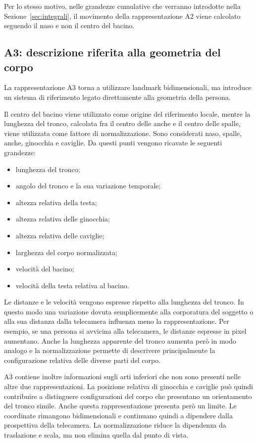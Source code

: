 Per lo stesso motivo, nelle grandezze cumulative che verranno introdotte nella Sezione~\ref{sec:integrali}, il movimento della rappresentazione A2 viene calcolato seguendo il naso e non il centro del bacino.

\subsection{A3: descrizione riferita alla geometria del corpo}

La rappresentazione A3 torna a utilizzare landmark bidimensionali, ma introduce un sistema di riferimento legato direttamente alla geometria della persona.

Il centro del bacino viene utilizzato come origine del riferimento locale, mentre la lunghezza del tronco, calcolata fra il centro delle anche e il centro delle spalle, viene utilizzata come fattore di normalizzazione.
Sono considerati naso, spalle, anche, ginocchia e caviglie. Da questi punti vengono ricavate le seguenti grandezze:
\begin{itemize}
    \item lunghezza del tronco;
    \item angolo del tronco e la sua variazione temporale;
    \item altezza relativa della testa;
    \item altezza relativa delle ginocchia;
    \item altezza relativa delle caviglie;
    \item larghezza del corpo normalizzata;
    \item velocità del bacino;
    \item velocità della testa relativa al bacino.
\end{itemize}

Le distanze e le velocità vengono espresse rispetto alla lunghezza del tronco. In questo modo una variazione dovuta semplicemente alla corporatura del soggetto o alla sua distanza dalla telecamera influenza meno la rappresentazione.
Per esempio, se una persona si avvicina alla telecamera, le distanze espresse in pixel aumentano. Anche la lunghezza apparente del tronco aumenta però in modo analogo e la normalizzazione permette di descrivere principalmente la configurazione relativa delle diverse parti del corpo.

A3 contiene inoltre informazioni sugli arti inferiori che non sono presenti nelle altre due rappresentazioni. La posizione relativa di ginocchia e caviglie può quindi contribuire a distinguere configurazioni del corpo che presentano un orientamento del tronco simile.
Anche questa rappresentazione presenta però un limite. Le coordinate rimangono bidimensionali e continuano quindi a dipendere dalla prospettiva della telecamera. La normalizzazione riduce la dipendenza da traslazione e scala, ma non elimina quella dal punto di vista.


